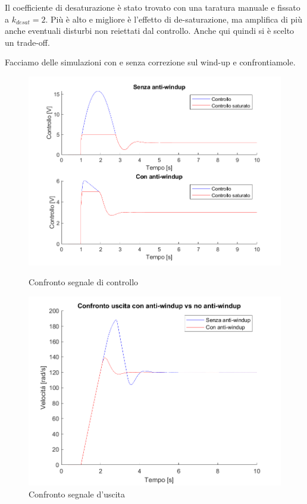 \documentclass[a4paper,12pt]{article}
\begin{document}
\vspace{0.5cm}

Il coefficiente di desaturazione è stato trovato con una taratura manuale e fissato a $k_{desat}=2$. Più è alto e migliore è l'effetto di de-saturazione, ma amplifica di più anche eventuali disturbi non reiettati dal controllo. Anche qui quindi si è scelto un trade-off.

\vspace{0.5cm}

Facciamo delle simulazioni con e senza correzione sul wind-up e confrontiamole.

\begin{figure}[h!]
    \centering
    \begin{minipage}{0.48\textwidth}
        \centering
        \includegraphics[width=\linewidth]{Immagini/PlotMatlab/controlloConfrontoWindUp.png}
        \caption{Confronto segnale di controllo}
        \label{fig:controlloConfontoWU}
    \end{minipage}\hfill
    \begin{minipage}{0.48\textwidth}
        \centering
        \includegraphics[width=\linewidth]{Immagini/PlotMatlab/uscitaConfrontoWindUp.png}
        \caption{Confronto segnale d'uscita}
        \label{fig:uscitaConfontoWU}
    \end{minipage}
\end{figure}
\end{document}
